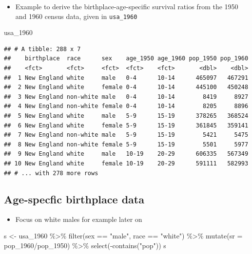 \documentclass[
]{book}
\newenvironment{Shaded}{\begin{snugshade}}{\end{snugshade}}
\newcommand{\AttributeTok}[1]{\textcolor[rgb]{0.77,0.63,0.00}{#1}}
\newcommand{\FunctionTok}[1]{\textcolor[rgb]{0.00,0.00,0.00}{#1}}
\newcommand{\NormalTok}[1]{#1}
\newcommand{\OtherTok}[1]{\textcolor[rgb]{0.56,0.35,0.01}{#1}}
\newcommand{\SpecialCharTok}[1]{\textcolor[rgb]{0.00,0.00,0.00}{#1}}
\newcommand{\StringTok}[1]{\textcolor[rgb]{0.31,0.60,0.02}{#1}}
\providecommand{\tightlist}{%
  \setlength{\itemsep}{0pt}\setlength{\parskip}{0pt}}
\begin{document}
\begin{itemize}
\tightlist
\item
  Example to derive the birthplace-age-specific survival ratios from the 1950 and 1960 census data, given in \texttt{usa\_1960}
\end{itemize}

\begin{Shaded}
\begin{Highlighting}[]
\NormalTok{usa\_1960}
\end{Highlighting}
\end{Shaded}

\begin{verbatim}
## # A tibble: 288 x 7
##    birthplace  race      sex    age_1950 age_1960 pop_1950 pop_1960
##    <fct>       <fct>     <fct>  <fct>    <fct>       <dbl>    <dbl>
##  1 New England white     male   0-4      10-14      465097   467291
##  2 New England white     female 0-4      10-14      445100   450248
##  3 New England non-white male   0-4      10-14        8419     8927
##  4 New England non-white female 0-4      10-14        8205     8896
##  5 New England white     male   5-9      15-19      378265   368524
##  6 New England white     female 5-9      15-19      361845   359141
##  7 New England non-white male   5-9      15-19        5421     5475
##  8 New England non-white female 5-9      15-19        5501     5977
##  9 New England white     male   10-19    20-29      606335   567349
## 10 New England white     female 10-19    20-29      591111   582993
## # ... with 278 more rows
\end{verbatim}

\hypertarget{age-specfic-birthplace-data-1}{%
\subsection{Age-specfic birthplace data}\label{age-specfic-birthplace-data-1}}

\begin{itemize}
\tightlist
\item
  Focus on white males for example later on
\end{itemize}

\begin{Shaded}
\begin{Highlighting}[]
\NormalTok{s }\OtherTok{\textless{}{-}}\NormalTok{ usa\_1960 }\SpecialCharTok{\%\textgreater{}\%}
  \FunctionTok{filter}\NormalTok{(sex }\SpecialCharTok{==} \StringTok{"male"}\NormalTok{,}
\NormalTok{         race }\SpecialCharTok{==} \StringTok{"white"}\NormalTok{) }\SpecialCharTok{\%\textgreater{}\%}
  \FunctionTok{mutate}\NormalTok{(}\AttributeTok{sr =}\NormalTok{ pop\_1960}\SpecialCharTok{/}\NormalTok{pop\_1950) }\SpecialCharTok{\%\textgreater{}\%}
  \FunctionTok{select}\NormalTok{(}\SpecialCharTok{{-}}\FunctionTok{contains}\NormalTok{(}\StringTok{"pop"}\NormalTok{))}
\NormalTok{s}
\end{Highlighting}
\end{Shaded}
\end{document}
